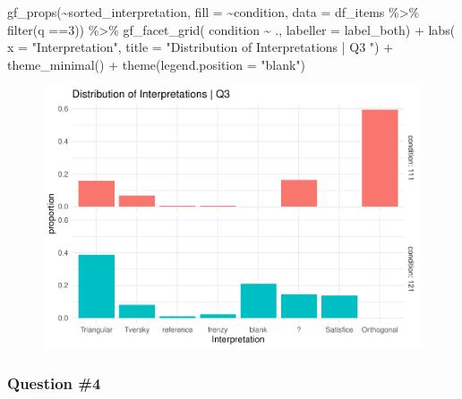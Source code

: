 \documentclass[
  letterpaper,
  DIV=11,
  numbers=noendperiod]{scrreprt}
\newenvironment{Shaded}{\begin{snugshade}}{\end{snugshade}}
\newcommand{\AttributeTok}[1]{\textcolor[rgb]{0.40,0.45,0.13}{#1}}
\newcommand{\DecValTok}[1]{\textcolor[rgb]{0.68,0.00,0.00}{#1}}
\newcommand{\FunctionTok}[1]{\textcolor[rgb]{0.28,0.35,0.67}{#1}}
\newcommand{\NormalTok}[1]{\textcolor[rgb]{0.00,0.23,0.31}{#1}}
\newcommand{\SpecialCharTok}[1]{\textcolor[rgb]{0.37,0.37,0.37}{#1}}
\newcommand{\StringTok}[1]{\textcolor[rgb]{0.13,0.47,0.30}{#1}}
\begin{document}
\begin{Shaded}
\begin{Highlighting}[]
\FunctionTok{gf\_props}\NormalTok{(}\SpecialCharTok{\textasciitilde{}}\NormalTok{sorted\_interpretation, }\AttributeTok{fill =} \SpecialCharTok{\textasciitilde{}}\NormalTok{condition, }\AttributeTok{data =}\NormalTok{ df\_items }\SpecialCharTok{\%\textgreater{}\%} \FunctionTok{filter}\NormalTok{(q }\SpecialCharTok{==}\DecValTok{3}\NormalTok{)) }\SpecialCharTok{\%\textgreater{}\%} 
  \FunctionTok{gf\_facet\_grid}\NormalTok{( condition }\SpecialCharTok{\textasciitilde{}}\NormalTok{ ., }\AttributeTok{labeller =}\NormalTok{ label\_both) }\SpecialCharTok{+} 
  \FunctionTok{labs}\NormalTok{( }\AttributeTok{x =} \StringTok{"Interpretation"}\NormalTok{, }\AttributeTok{title =} \StringTok{"Distribution of Interpretations | Q3 "}\NormalTok{) }\SpecialCharTok{+} 
  \FunctionTok{theme\_minimal}\NormalTok{() }\SpecialCharTok{+} \FunctionTok{theme}\NormalTok{(}\AttributeTok{legend.position =} \StringTok{"blank"}\NormalTok{)}
\end{Highlighting}
\end{Shaded}

\begin{figure}[H]

{\centering \includegraphics{analysis/SGC3A/2_sgc3A_scoring_files/figure-pdf/Q3-distribution-2.pdf}

}

\end{figure}

\hypertarget{question-4}{%
\subsubsection{Question \#4}\label{question-4}}
\end{document}
